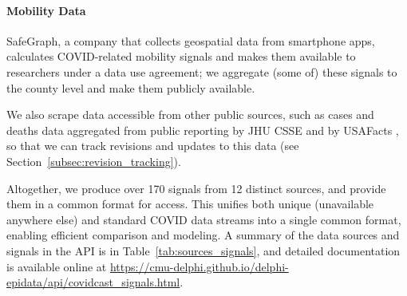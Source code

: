 \documentclass[11pt]{article}
\begin{document}
\paragraph{Mobility Data} SafeGraph, a company that collects geospatial data
from smartphone apps, calculates COVID-related mobility signals
\cite{SafeGraphSocial, SafeGraphPatterns} and makes them available to
researchers under a data use agreement; we aggregate (some of) these signals to
the county level and make them publicly available.

\medskip
We also scrape data accessible from other public sources, such as cases and
deaths data aggregated from public reporting by JHU CSSE \cite{Dong:2020} and by
USAFacts \cite{USAFacts}, so that we can track revisions and updates to this data
(see Section~\ref{subsec:revision_tracking}).

Altogether, we produce over 170 signals from 12 distinct sources, and provide
them in a common format for access. This unifies both unique (unavailable
anywhere else) and standard COVID data streams into a single common
format, enabling efficient comparison and modeling. A summary of the data
sources and signals in the API is in Table~\ref{tab:sources_signals}, and
detailed documentation is available online at
\url{https://cmu-delphi.github.io/delphi-epidata/api/covidcast_signals.html}.
\end{document}
